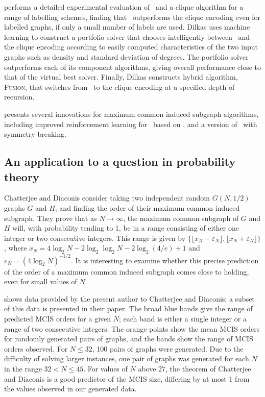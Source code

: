 \citet{dilkas2018} performs a detailed experimental evaluation
of \McSplit\ and a clique algorithm for a range of labelling schemes, finding that \McSplit\
outperforms the clique encoding even for labelled graphs, if only a small number of labels are
used.  Dilkas uses machine learning to construct a portfolio solver that chooses intelligently
between \McSplit\ and the clique encoding according to easily computed characteristics of the
two input graphs such as density and standard deviation of degrees. The portfolio solver
outperforms each of its component algorithms, giving overall performance close to that of the virtual
best solver.  Finally, Dilkas constructs hybrid algorithm, \textsc{Fusion}, that switches
from \McSplit\ to the clique encoding at a specified depth of recursion.

\cite{trummer2021} presents several innovations for maximum common induced subgraph algorithms,
including improved reinforcement learning for \McSplit\ based on
\citet{DBLP:conf/aaai/0001LJ020}, and a version of \McSplit\ with symmetry breaking.

\subsection{An application to a question in probability theory}

Chatterjee and Diaconis \cite{chatterjee2021isomorphisms} consider taking two
independent random $G(N, 1/2)$ graphs $G$ and $H$, and finding the order of their maximum
common induced subgraph.  They prove that as $N\to\infty$, the maximum common
subgraph of $G$ and $H$ will, with probability tending to 1, be in a range
consisting of either one integer or two consecutive integers.  This range
is given by $\{\lfloor x_N - \varepsilon_N\rfloor, \lfloor x_N + \varepsilon_N\rfloor\}$,
where $x_N = 4 \log_2 N - 2 \log_2\log_2 N - 2 \log_2(4/e) + 1$
and $\varepsilon_N = (4 \log_2 N)^{-1/2}$.  It is interesting to examine whether
this precise prediction of the order of a maximum common induced subgraph
comes close to holding, even for small values of $N$.

shows data provided by the present author to Chatterjee and Diaconis; a subset
of this data is presented in their paper.  The broad blue bands give the
range of predicted MCIS orders for a given $N$; each band is either a single
integer or a range of two consecutive integers.  The orange points show the mean
MCIS orders for randomly generated pairs of graphs, and the bands show the
range of MCIS orders observed.  For $N \leq 32$, 100 pairs of graphs were
generated.  Due to the difficulty of solving larger instances, one pair
of graphs was generated for each $N$ in the range $32 < N \leq 45$.  For values
of $N$ above 27, the theorem of Chatterjee and Diaconis is a good predictor
of the MCIS size, differing by at most 1 from the values observed in our
generated data.

